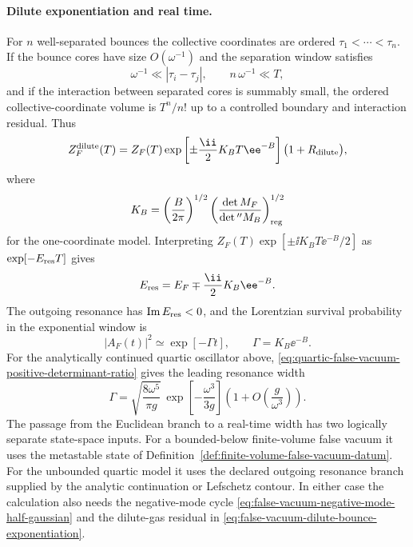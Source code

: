 \paragraph{Dilute exponentiation and real time.}
For \(n\) well-separated bounces the collective coordinates are ordered
\(\tau_1<\cdots<\tau_n\).  If the bounce cores have size \(O(\omega^{-1})\)
and the separation window satisfies
\[
  \omega^{-1}\ll |\tau_i-\tau_j|,\qquad
  n\,\omega^{-1}\ll T,
\]
and if the interaction between separated cores is summably small, the ordered
collective-coordinate volume is \(T^n/n!\) up to a controlled boundary and
interaction residual.  Thus
\begin{equation}
  Z_F^{\rm dilute}(T)
  =
  Z_F(T)
  \exp\left[
    \pm\frac{\ii}{2}
    K_B T\ee^{-B}
  \right]
  \bigl(1+R_{\rm dilute}\bigr),
  \label{eq:false-vacuum-dilute-bounce-exponentiation}
\end{equation}
where
\begin{equation}
  K_B
  =
  \left(\frac{B}{2\pi}\right)^{1/2}
  \left(\frac{\det M_F}{\det{}''M_B}\right)_{\rm reg}^{1/2}
  \label{eq:false-vacuum-bounce-prefactor}
\end{equation}
for the one-coordinate model.  Interpreting
\(Z_F(T)\exp[\pm\ii K_BT\ee^{-B}/2]\) as
\(\exp[-E_{\rm res}T]\) gives
\[
  E_{\rm res}=E_F\mp\frac{\ii}{2}K_B\ee^{-B}.
\]
The outgoing resonance has \(\operatorname{Im}E_{\rm res}<0\), and the
Lorentzian survival probability in the exponential window is
\begin{equation}
  |A_F(t)|^2\simeq \exp[-\Gamma t],
  \qquad
  \Gamma=K_B\ee^{-B}.
  \label{eq:false-vacuum-real-time-width}
\end{equation}
For the analytically continued quartic oscillator above,
\eqref{eq:quartic-false-vacuum-positive-determinant-ratio} gives the leading
resonance width
\begin{equation}
  \Gamma
  =
  \sqrt{\frac{8\omega^5}{\pi g}}\,
  \exp\left[-\frac{\omega^3}{3g}\right]
  \left(1+O\!\left(\frac{g}{\omega^3}\right)\right).
  \label{eq:quartic-false-vacuum-leading-width}
\end{equation}
The passage from the Euclidean branch to a real-time width has two logically
separate state-space inputs.  For a bounded-below finite-volume false vacuum
it uses the metastable state of
Definition~\ref{def:finite-volume-false-vacuum-datum}.  For the unbounded
quartic model it uses the declared outgoing resonance branch supplied by the
analytic continuation or Lefschetz contour.  In either case the calculation
also needs the negative-mode cycle
\eqref{eq:false-vacuum-negative-mode-half-gaussian} and the dilute-gas
residual in \eqref{eq:false-vacuum-dilute-bounce-exponentiation}.

